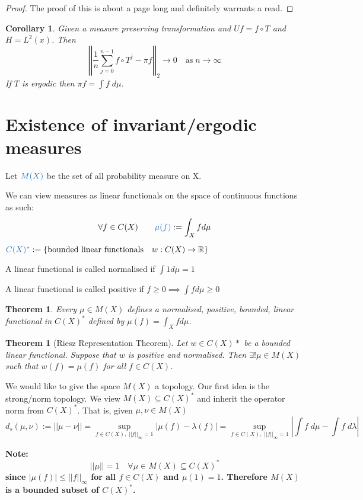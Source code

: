 \documentclass[11pt]{article}
\newcommand{\defeq}{:=}
\newcommand{\abs}[1]{\left|#1\right|}
\newcommand{\norm}[1]{\left|\left|#1\right|\right|}
\newcommand{\R}{\mathbb{R}}
\newenvironment{defin}
	{\begin{mdframed}[backgroundcolor=white, roundcorner=5pt, linewidth=1pt, linecolor=RoyalBlue]}
	{\end{mdframed}}
\newcommand{\mdf}[1]{{\color{RoyalBlue} #1}}
\newenvironment{note}
	{\begin{mdframed}[backgroundcolor=white, linecolor=RubineRed, roundcorner=5pt, linewidth=1pt]\bfseries{Note:}\normalfont}
	{\end{mdframed}}
\newtheorem{theorem}[prop]{Theorem}
\newtheorem{cor}[prop]{Corollary}
\begin{document}
\begin{proof}
The proof of this is about a page long and definitely warrants a read.
\end{proof}

\begin{cor}
	Given a measure preserving transformation and $Uf=f\circ T$ and $H=L^2(x)$. Then
	\[
		\norm{\frac{1}{n}\sum_{j=0}^{n-1}f\circ T^j - \pi f}_2 \to 0 \quad \text{as} \; n\to\infty
	\]
	If $T$ is ergodic then $\pi f = \int f\; d\mu$.
\end{cor}

\section{Existence of invariant/ergodic measures}
\begin{defin}
Let $\mdf{M(X)}$ be the set of all probability measure on X.

We can view measures as linear functionals on the space of continuous functions as such:
$$\forall f\in C(X)\quad\quad \mdf{\mu(f)}\defeq\int_X f d\mu$$

$\mdf{C(X)^*}\defeq\{\text{bounded linear functionals}\quad w:C(X)\to\R\}$

A linear functional is called \mdf{normalised} if $\int 1 d\mu =1$

A linear functional is called \mdf{positive} if $f\geq 0\implies \int f d\mu \geq 0$
\end{defin}
\begin{theorem}
	Every $\mu\in M(X)$ defines a normalised, positive, bounded, linear functional in $C(X)^*$ defined by $\mu(f)=\int_X f d\mu$.
\end{theorem}
\begin{theorem}[Riesz Representation Theorem]
	Let $w\in C(X)*$ be a bounded linear functional. Suppose that $w$ is positive and normalised. Then $\exists !\mu\in M(X)$ such that $w(f)=\mu(f)$ for all $f\in C(X)$.
\end{theorem}

We would like to give the space $M(X)$ a topology.
Our first idea is the \mdf{strong/norm topology}.
We view $M(X) \subseteq C(X)^\ast$ and inherit the operator norm from $C(X)^\ast$.
That is, given $\mu, \nu \in M(X)$
\[
	d_s(\mu, \nu) \defeq \norm{\mu - \nu} = \sup_{f\in C(X) , \; \norm{f}_\infty=1}\abs{\mu(f)- \lambda(f)} = \sup_{f\in C(X) , \; \norm{f}_\infty=1} \abs{\int f \;d\mu - \int f \; d\lambda}
\]

\begin{note}
	\[
 		\norm{\mu} =1 \quad \forall \mu \in M(X) \subseteq C(X)^\ast
	\]
	since $\abs{\mu(f)}\leq\norm{f}_\infty$ for all $f\in C(X)$ and $\mu(1)=1$.
	Therefore $M(X)$ is a bounded subset of $C(X)^\ast$.
\end{note}
\end{document}
